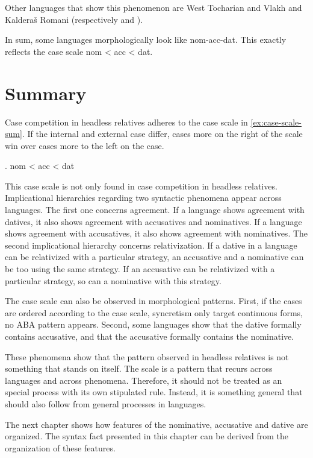 Other languages that show this phenomenon are West Tocharian \citep{gippert1987} and Vlakh and Kalderaš Romani (respectively \citealt{friedman1991} and \citealt{boretzky1994}).

In sum, some languages morphologically look like \ac{nom}-\ac{acc}-\ac{dat}. This exactly reflects the case scale \ac{nom} < \ac{acc} < \ac{dat}.

\section{Summary}

Case competition in headless relatives adheres to the case scale in \ref{ex:case-scale-sum}. If the internal and external case differ, cases more on the right of the scale win over cases more to the left on the case.

\ex. \ac{nom} < \ac{acc} < \ac{dat}\label{ex:case-scale-sum}

This case scale is not only found in case competition in headless relatives. Implicational hierarchies regarding two syntactic phenomena appear across languages. The first one concerns agreement. If a language shows agreement with datives, it also shows agreement with accusatives and nominatives. If a language shows agreement with accusatives, it also shows agreement with nominatives.
The second implicational hierarchy concerns relativization. If a dative in a language can be relativized with a particular strategy, an accusative and a nominative can be too using the same strategy. If an accusative can be relativized with a particular strategy, so can a nominative with this strategy.

The case scale can also be observed in morphological patterns. First, if the cases are ordered according to the case scale, syncretism only target continuous forms, no ABA pattern appears. Second, some languages show that the dative formally contains accusative, and that the accusative formally contains the nominative.

These phenomena show that the pattern observed in headless relatives is not something that stands on itself. The scale is a pattern that recurs across languages and across phenomena. Therefore, it should not be treated as an special process with its own stipulated rule. Instead, it is something general that should also follow from general processes in languages.

The next chapter shows how features of the nominative, accusative and dative are organized. The syntax fact presented in this chapter can be derived from the organization of these features.
